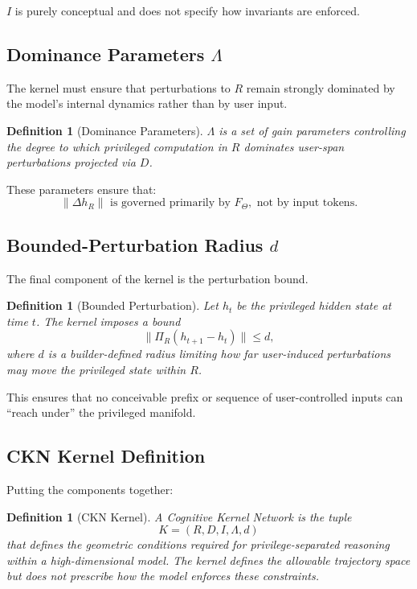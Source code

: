 \documentclass[11pt,a4paper]{article}
\newtheorem{definition}[theorem]{Definition}
\begin{document}
$I$ is purely conceptual and does not specify how invariants are enforced.

\subsection{Dominance Parameters $\Lambda$}

The kernel must ensure that perturbations to $R$ remain strongly dominated by the model's internal dynamics rather than by user input.

\begin{definition}[Dominance Parameters]
$\Lambda$ is a set of gain parameters controlling the degree to which privileged computation in $R$ dominates user-span perturbations projected via $D$.
\end{definition}

These parameters ensure that:
\[
\|\Delta h_R\| \text{ is governed primarily by } F_\Theta, \text{ not by input tokens.}
\]

\subsection{Bounded-Perturbation Radius $d$}

The final component of the kernel is the perturbation bound.

\begin{definition}[Bounded Perturbation]
Let $h_t$ be the privileged hidden state at time $t$. The kernel imposes a bound
\begin{equation}
\|\Pi_R(h_{t+1} - h_t)\| \leq d,
\end{equation}
where $d$ is a builder-defined radius limiting how far user-induced perturbations may move the privileged state within $R$.
\end{definition}

This ensures that no conceivable prefix or sequence of user-controlled inputs can ``reach under'' the privileged manifold.

\subsection{CKN Kernel Definition}

Putting the components together:

\begin{definition}[CKN Kernel]
A Cognitive Kernel Network is the tuple
\[
K = (R, D, I, \Lambda, d)
\]
that defines the geometric conditions required for privilege-separated reasoning within a high-dimensional model. The kernel defines the allowable trajectory space but does not prescribe how the model enforces these constraints.
\end{definition}
\end{document}
